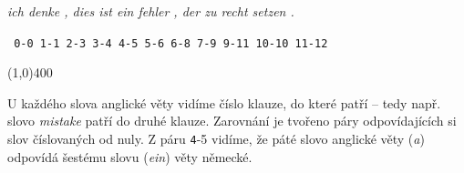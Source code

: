 \documentclass[12pt,a4paper]{report}
\begin{document}
\textit{\color{red}
ich denke , dies ist ein fehler , der zu recht setzen .}

\texttt{{\color{blue} 0}-{\color{red}0} {\color{blue}1}-{\color{red}1} {\color{blue}2}-{\color{red}3} {\color{blue}3}-{\color{red}4} {\color{blue}4}-{\color{red}5} {\color{blue}5}-{\color{red}6} {\color{blue}6}-{\color{red}8} {\color{blue}7}-{\color{red}9} {\color{blue}9}-{\color{red}11} {\color{blue}10}-{\color{red}10} {\color{blue}11}-{\color{red}12}}

\line(1,0){400}

U každého slova anglické věty vidíme číslo klauze, do které patří -- tedy např. slovo \textit{\color{blue}mistake} patří do druhé klauze. Zarovnání je tvořeno páry odpovídajících si slov číslovaných od nuly. Z páru \texttt{\color{blue}4}-{\color{red}5} vidíme, že páté slovo anglické věty (\textit{\color{blue}a}) odpovídá šestému slovu (\textit{\color{red}ein}) věty německé.



\end{document}
